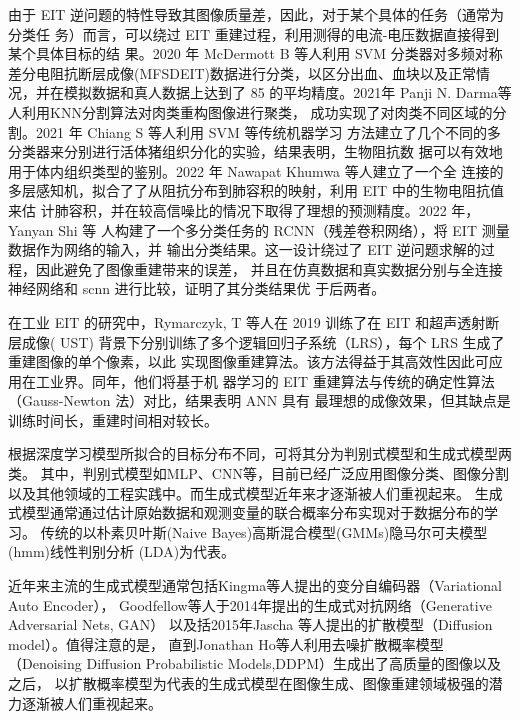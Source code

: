 由于 EIT 逆问题的特性导致其图像质量差，因此，对于某个具体的任务（通常为分类任
务）而言，可以绕过 EIT 重建过程，利用测得的电流-电压数据直接得到某个具体目标的结
果。2020 年 McDermott B 等人利用 SVM 分类器对多频对称差分电阻抗断层成像(MFSDEIT)数据进行分类，以区分出血、血块以及正常情况，并在模拟数据和真人数据上达到了 85%
的平均精度\cite{article1234568}。2021年 Panji N. Darma等人利用KNN分割算法对肉类重构图像进行聚类，
成功实现了对肉类不同区域的分割\cite{9625686}。2021 年 Chiang S 等人利用 SVM 等传统机器学习
方法建立了几个不同的多分类器来分别进行活体猪组织分化的实验，结果表明，生物阻抗数
据可以有效地用于体内组织类型的鉴别\cite{app9194049}。2022 年 Nawapat Khumwa 等人建立了一个全
连接的多层感知机，拟合了了从阻抗分布到肺容积的映射，利用 EIT 中的生物电阻抗值来估
计肺容积，并在较高信噪比的情况下取得了理想的预测精度\cite{9741619}。2022 年， Yanyan Shi 等
人构建了一个多分类任务的 RCNN（残差卷积网络），将 EIT 测量数据作为网络的输入，并
输出分类结果。这一设计绕过了 EIT 逆问题求解的过程，因此避免了图像重建带来的误差，
并且在仿真数据和真实数据分别与全连接神经网络和 scnn 进行比较，证明了其分类结果优
于后两者\cite{9751762}。

在工业 EIT 的研究中，Rymarczyk, T 等人在 2019 训练了在 EIT 和超声透射断层成像( UST)
背景下分别训练了多个逻辑回归子系统（LRS），每个 LRS 生成了重建图像的单个像素，以此
实现图像重建算法。该方法得益于其高效性因此可应用在工业界\cite{s19153400}。同年，他们将基于机
器学习的 EIT 重建算法与传统的确定性算法（Gauss-Newton 法）对比，结果表明 ANN 具有
最理想的成像效果，但其缺点是训练时间长，重建时间相对较长\cite{article123456}。


根据深度学习模型所拟合的目标分布不同，可将其分为判别式模型和生成式模型两类。
其中，判别式模型如MLP、CNN等，目前已经广泛应用图像分类、图像分割以及其他领域的工程实践中。而生成式模型近年来才逐渐被人们重视起来。
生成式模型通常通过估计原始数据和观测变量的联合概率分布实现对于数据分布的学习。
传统的以朴素贝叶斯(Naive Bayes)高斯混合模型(GMMs)隐马尔可夫模型(hmm)线性判别分析 (LDA)为代表。

近年来主流的生成式模型通常包括Kingma等人提出的变分自编码器（Variational Auto Encoder）\cite{2013Auto}，
Goodfellow等人于2014年提出的生成式对抗网络\cite{2014Generative}（Generative Adversarial Nets, GAN）
以及括2015年Jascha 等人提出的扩散模型\cite{DiffusionModel}（Diffusion model）。值得注意的是，
直到Jonathan Ho等人利用去噪扩散概率模型\cite{DDPM}（Denoising Diffusion Probabilistic Models,DDPM）生成出了高质量的图像以及之后，
以扩散概率模型为代表的生成式模型在图像生成、图像重建领域极强的潜力逐渐被人们重视起来。

